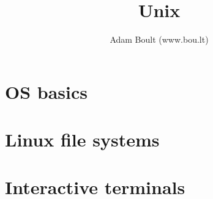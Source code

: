 \documentclass[oneside]{book}
\begin{document}
\author{Adam Boult (www.bou.lt)}
\title{Unix}
\maketitle

\setcounter{tocdepth}{0}
\tableofcontents





\part{OS basics}






\part{Linux file systems}













\part{Interactive terminals}


\end{document}
